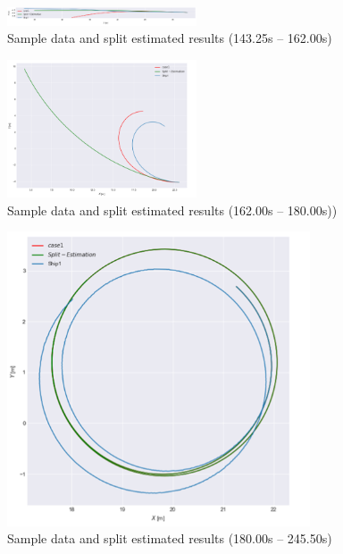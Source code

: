 \begin{figure}[htbp]
    \centering   
    \includegraphics[width=0.5\textwidth]{./img/5-1.png}
    \caption{Sample data and split estimated results (143.25s – 162.00s)}
    \label{fig:5-1_png}
\end{figure}

\begin{figure}[htbp]
    \centering
    \includegraphics[width=0.5\textwidth]{./img/5-2.png}
    \caption{Sample data and split estimated results (162.00s – 180.00s))}
    \label{fig:5-2_png}
\end{figure}

\begin{figure}[htbp]
    \centering
    \includegraphics[width=0.8\textwidth]{./img/5-3.png}
    \caption{Sample data and split estimated results (180.00s – 245.50s)}
    \label{fig:5-3_png}
\end{figure}

